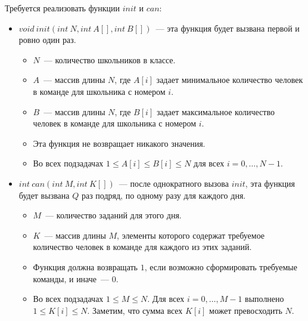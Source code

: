 Требуется реализовать функции $init$ и $can$:
 \begin{itemize}
 \item $void\ init(int\ N, int\ A[], int\ B[])$~--- эта функция будет вызвана первой и ровно один раз.
 \begin{itemize}
 \item $N$~--- количество школьников в классе.
 \item $A$~--- массив длины $N$, где $A[i]$ задает минимальное количество человек в команде
 для школьника с номером $i$.
 \item $B$~--- массив длины $N$, где $B[i]$ задает максимальное количество человек в
 команде для школьника с номером $i$.
 \item Эта функция не возвращает никакого значения.
 \item Во всех подзадачах $1 \le A[i] \le B[i] \le N$ для всех $i = 0, \ldots, N - 1$.
 \end{itemize}
 \item $int\ can(int\ M, int\ K[])$~--- после однократного вызова $init$, эта функция будет вызвана $Q$ раз
 подряд, по одному разу для каждого дня.
 \begin{itemize}
 \item $M$~--- количество заданий для этого дня.
 \item $K$~---  массив длины $M$, элементы которого содержат требуемое количество человек
 в команде для каждого из этих заданий.
 \item Функция должна возвращать $1$, если возможно сформировать требуемые команды,
 и иначе~--- $0$.
 \item Во всех подзадачах $1 \le M \le N$. Для всех $i = 0, \ldots, M - 1$ выполнено
 $1 \le K[i] \le N$. Заметим, что сумма всех $K[i]$ может превосходить $N$.
 \end{itemize}
 \end{itemize}
 
